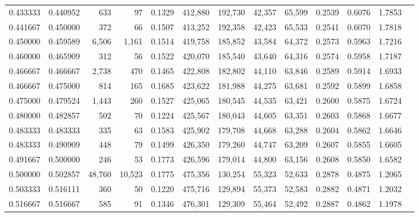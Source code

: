 \begin{tabular}{rrrrrrrrrrrrr}
0.433333 & 0.440952 &    633 &     97 &                                     0.1329 & 412,880 & 192,730 &  42,357 &  65,599 & 0.2539 & 0.6076 & 1.7853 \\
0.441667 & 0.450000 &    372 &     66 &                                     0.1507 & 413,252 & 192,358 &  42,423 &  65,533 & 0.2541 & 0.6070 & 1.7818 \\
0.450000 & 0.459589 &  6,506 &  1,161 &                                     0.1514 & 419,758 & 185,852 &  43,584 &  64,372 & 0.2573 & 0.5963 & 1.7216 \\
0.460000 & 0.465909 &    312 &     56 &                                     0.1522 & 420,070 & 185,540 &  43,640 &  64,316 & 0.2574 & 0.5958 & 1.7187 \\
0.466667 & 0.466667 &  2,738 &    470 &                                     0.1465 & 422,808 & 182,802 &  44,110 &  63,846 & 0.2589 & 0.5914 & 1.6933 \\
0.466667 & 0.475000 &    814 &    165 &                                     0.1685 & 423,622 & 181,988 &  44,275 &  63,681 & 0.2592 & 0.5899 & 1.6858 \\
0.475000 & 0.479524 &  1,443 &    260 &                                     0.1527 & 425,065 & 180,545 &  44,535 &  63,421 & 0.2600 & 0.5875 & 1.6724 \\
0.480000 & 0.482857 &    502 &     70 &                                     0.1224 & 425,567 & 180,043 &  44,605 &  63,351 & 0.2603 & 0.5868 & 1.6677 \\
0.483333 & 0.483333 &    335 &     63 &                                     0.1583 & 425,902 & 179,708 &  44,668 &  63,288 & 0.2604 & 0.5862 & 1.6646 \\
0.483333 & 0.490909 &    448 &     79 &                                     0.1499 & 426,350 & 179,260 &  44,747 &  63,209 & 0.2607 & 0.5855 & 1.6605 \\
0.491667 & 0.500000 &    246 &     53 &                                     0.1773 & 426,596 & 179,014 &  44,800 &  63,156 & 0.2608 & 0.5850 & 1.6582 \\
0.500000 & 0.502857 & 48,760 & 10,523 &                                     0.1775 & 475,356 & 130,254 &  55,323 &  52,633 & 0.2878 & 0.4875 & 1.2065 \\
0.503333 & 0.516111 &    360 &     50 &                                     0.1220 & 475,716 & 129,894 &  55,373 &  52,583 & 0.2882 & 0.4871 & 1.2032 \\
0.516667 & 0.516667 &    585 &     91 &                                     0.1346 & 476,301 & 129,309 &  55,464 &  52,492 & 0.2887 & 0.4862 & 1.1978 \\

\end{tabular}
